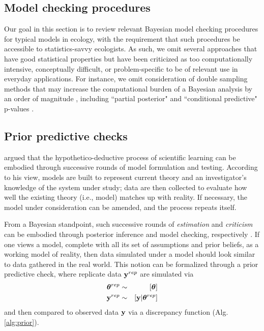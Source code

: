 \documentclass[12pt,english]{article}
\begin{document}
\begin{spacing}{1.9}
\section{Model checking procedures}

Our goal in this section is to review relevant Bayesian model checking procedures for typical models in ecology, with the requirement that such procedures be accessible to statistics-savvy ecologists.  As such, we omit several approaches that have good statistical properties but have been criticized \citep[e.g.][]{Johnson2007b,Zhang2014} as too computationally intensive, conceptually difficult, or problem-specific to be of relevant use in everyday applications.  For instance, we omit consideration of double sampling methods that may increase the computational burden of a Bayesian analysis by an order of magnitude \citep{Johnson2007b}, including  ``partial posterior" and ``conditional predictive" p-values \citep[see e.g.][]{BayarriBerger1999,RobinsEtAl2000,BayarriCastellanos2007}.

\subsection{Prior predictive checks}

\citet{Box1980} argued that the hypothetico-deductive process of scientific learning can be embodied through successive rounds of model formulation and testing. According to his view, models are built to represent current theory and an investigator's knowledge of the system under study; data are then collected to evaluate how well the existing theory (i.e., model) matches up with reality.  If necessary, the model under consideration can be amended, and the process repeats itself.

From a Bayesian standpoint, such successive rounds of \textit{estimation} and \textit{criticism} can be embodied through posterior inference and model checking, respectively \citep{Box1980}.
If one views a model, complete with all its set of assumptions and prior beliefs, as a working model of reality, then data simulated under a model should look similar to data gathered in the real world.  This notion can be formalized through a prior predictive check, where replicate data ${\bf y}^{rep}$ are simulated via
\begin{eqnarray}
   \label{eq:prior}
   \boldsymbol{\theta}^{rep} & \sim & [\boldsymbol{\theta}] \\
   {\bf y}^{rep} & \sim & [{\bf y}|\boldsymbol{\theta}^{rep}] \nonumber
\end{eqnarray}
and then compared to observed data ${\bf y}$ via a discrepancy function (Alg. \ref{alg:prior}).


\end{spacing}
\end{document}
